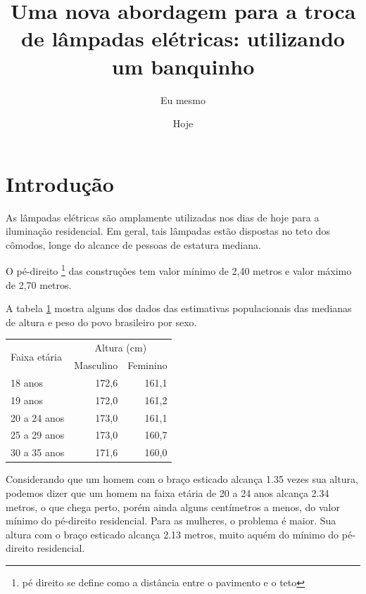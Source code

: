 \documentclass{article}
\author{Eu mesmo}
\date{Hoje}
\title{Uma nova abordagem para a troca de
       lâmpadas elétricas: utilizando um banquinho}
\begin{document}
\maketitle

\newpage

\section{Introdução}
\label{sec:intro}

As lâmpadas elétricas são amplamente utilizadas nos dias
de hoje para a iluminação residencial.
Em geral, tais lâmpadas estão dispostas no teto dos cômodos,
longe do alcance de pessoas de estatura mediana.

O pé-direito 
\footnote{pé direito se define como a distância entre o pavimento e o teto}
das construções tem valor mínimo de 2,40 metros e valor máximo de 2,70 metros.

A tabela \ref{tab:ibge} mostra alguns dos dados das estimativas populacionais das
medianas de altura e peso do povo brasileiro por sexo.

\begin{table}[!htb]
  	\centering
  	\begin{tabular}{|l|r|r|}
  	\hline
    \multirow{2}{*}{Faixa etária} & \multicolumn{2}{|c|}{Altura (cm)} \\ \cline{2-3}
                 & Masculino & Feminino \\ \hline
    18      anos & 172,6 & 161,1 \\
    19      anos & 172,0 & 161,2 \\
    20 a 24 anos & 173,0 & 161,1 \\
    25 a 29 anos & 173,0 & 160,7 \\
    30 a 35 anos & 171,6 & 160,0 \\
    \hline
    \end{tabular}
    \label{tab:ibge}
\end{table}

Considerando que um homem com o braço esticado alcança 1.35 vezes sua altura,
podemos dizer que um homem na faixa etária de 20 a 24 anos alcança 2.34 metros,
o que chega perto, porém ainda alguns centímetros a menos, do valor mínimo do
pé-direito residencial.
Para as mulheres, o problema é maior. Sua altura com o braço esticado alcança
2.13 metros, muito aquém do mínimo do pé-direito residencial.
\end{document}
